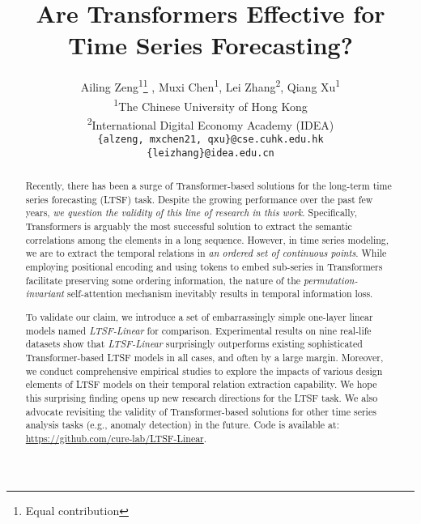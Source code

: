 \documentclass[10pt,twocolumn,letterpaper]{article}
\begin{document}
\title{Are Transformers Effective for Time Series Forecasting?}

\newcommand*{\affaddr}[1]{#1} \newcommand*{\affmark}[1][*]{\textsuperscript{#1}}
\newcommand*{\email}[1]{\texttt{#1}}

\makeatletter
\newcommand{\printfnsymbol}[1]{\textsuperscript{\@fnsymbol{#1}}}
\makeatother

\author{Ailing Zeng\affmark[1]\thanks{Equal contribution} , Muxi Chen\affmark[1]\printfnsymbol{1}, Lei Zhang\affmark[2], Qiang Xu\affmark[1]\\
\affaddr{\affmark[1]The Chinese University of Hong Kong}\\
\affaddr{\affmark[2]International Digital Economy Academy (IDEA)}\\
\email{\tt\small\{alzeng, mxchen21, qxu\}@cse.cuhk.edu.hk}\\
\email{\tt\small\{leizhang\}@idea.edu.cn}
}






\maketitle

\begin{abstract}
Recently, there has been a surge of Transformer-based solutions for the long-term time series forecasting (LTSF) task. Despite the growing performance over the past few years, \emph{we question the validity of this line of research in this work}.
Specifically, Transformers is arguably the most successful solution to extract the semantic correlations among the elements in a long sequence. However, in time series modeling, we are to extract the temporal relations in \emph{an ordered set of continuous points}. While employing positional encoding and using tokens to embed sub-series in Transformers facilitate preserving some ordering information, the nature of the \emph{permutation-invariant} self-attention mechanism inevitably results in temporal information loss. 

To validate our claim, we introduce a set of embarrassingly simple one-layer linear models named \emph{LTSF-Linear} for comparison. Experimental results on nine real-life datasets show that \emph{LTSF-Linear} surprisingly outperforms existing sophisticated Transformer-based LTSF models in all cases, and often by a large margin. Moreover, we conduct comprehensive empirical studies to explore the impacts of various design elements of LTSF models on their temporal relation extraction capability.
We hope this surprising finding opens up new research directions for the LTSF task. We also advocate revisiting the validity of Transformer-based solutions for other time series analysis tasks (e.g., anomaly detection) in the future. Code is available at: \url{https://github.com/cure-lab/LTSF-Linear}.

\end{abstract}
\end{document}
